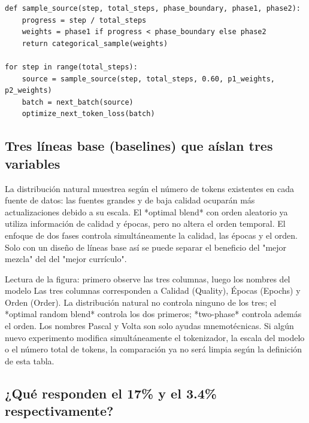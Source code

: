 \begin{lstlisting}[caption={Muestreador two-phase bajo presupuesto de token fijo}]
def sample_source(step, total_steps, phase_boundary, phase1, phase2):
    progress = step / total_steps
    weights = phase1 if progress < phase_boundary else phase2
    return categorical_sample(weights)

for step in range(total_steps):
    source = sample_source(step, total_steps, 0.60, p1_weights, p2_weights)
    batch = next_batch(source)
    optimize_next_token_loss(batch)
\end{lstlisting}

\subsection{Tres líneas base (baselines) que aíslan tres variables}

La distribución natural muestrea según el número de tokens existentes en cada fuente de datos: las fuentes grandes y de baja calidad ocuparán más actualizaciones debido a su escala. El *optimal blend* con orden aleatorio ya utiliza información de calidad y épocas, pero no altera el orden temporal. El enfoque de dos fases controla simultáneamente la calidad, las épocas y el orden. Solo con un diseño de líneas base así se puede separar el beneficio del "mejor mezcla" del del "mejor currículo".


\begin{knowledgebox}{Lectura de la figura: primero observe las tres columnas, luego los nombres del modelo}
Las tres columnas corresponden a Calidad (Quality), Épocas (Epochs) y Orden (Order). La distribución natural no controla ninguno de los tres; el *optimal random blend* controla los dos primeros; *two-phase* controla además el orden. Los nombres Pascal y Volta son solo ayudas mnemotécnicas. Si algún nuevo experimento modifica simultáneamente el tokenizador, la escala del modelo o el número total de tokens, la comparación ya no será limpia según la definición de esta tabla.
\end{knowledgebox}

\subsection{¿Qué responden el 17\% y el 3.4\% respectivamente?}

